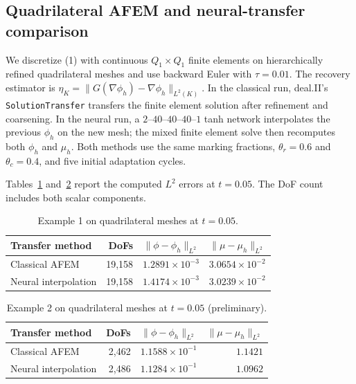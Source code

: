 \subsection{Quadrilateral AFEM and neural-transfer comparison}

We discretize (1) with continuous $Q_1\times Q_1$ finite elements on
hierarchically refined quadrilateral meshes and use backward Euler with
$\tau=0.01$.  The recovery estimator is
$\eta_K=\lVert G(\nabla\phi_h)-\nabla\phi_h\rVert_{L^2(K)}$.  In the
classical run, deal.II's \texttt{SolutionTransfer} transfers the finite element
solution after refinement and coarsening.  In the neural run, a
$2$--$40$--$40$--$40$--$1$ tanh network interpolates the previous
$\phi_h$ on the new mesh; the mixed finite element solve then recomputes both
$\phi_h$ and $\mu_h$.  Both methods use the same marking fractions,
$\theta_r=0.6$ and $\theta_c=0.4$, and five initial adaptation cycles.

Tables~\ref{tab:ex1-transfer} and~\ref{tab:ex2-transfer} report the computed
$L^2$ errors at $t=0.05$.  The DoF count includes both scalar components.

\begin{table}[htbp]
  \centering
  \caption{Example 1 on quadrilateral meshes at $t=0.05$.}
  \label{tab:ex1-transfer}
  \begin{tabular}{lrrr}
    \hline
    Transfer method & DoFs & $\lVert\phi-\phi_h\rVert_{L^2}$ &
      $\lVert\mu-\mu_h\rVert_{L^2}$ \\
    \hline
    Classical AFEM & 19,158 & $1.2891\times10^{-3}$ & $3.0654\times10^{-2}$ \\
    Neural interpolation & 19,158 & $1.4174\times10^{-3}$ & $3.0239\times10^{-2}$ \\
    \hline
  \end{tabular}
\end{table}

\begin{table}[htbp]
  \centering
  \caption{Example 2 on quadrilateral meshes at $t=0.05$ (preliminary).}
  \label{tab:ex2-transfer}
  \begin{tabular}{lrrr}
    \hline
    Transfer method & DoFs & $\lVert\phi-\phi_h\rVert_{L^2}$ &
      $\lVert\mu-\mu_h\rVert_{L^2}$ \\
    \hline
    Classical AFEM & 2,462 & $1.1588\times10^{-1}$ & $1.1421$ \\
    Neural interpolation & 2,486 & $1.1284\times10^{-1}$ & $1.0962$ \\
    \hline
  \end{tabular}
\end{table}

